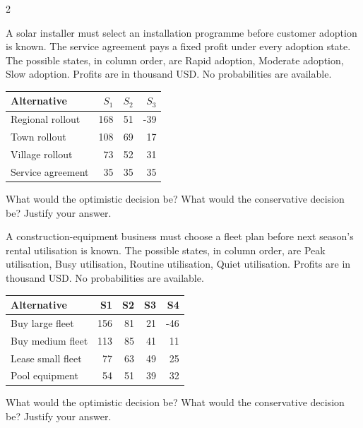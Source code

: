 \begin{multicols}{2}
\begin{minipage}{\linewidth}
A solar installer must select an installation programme before customer adoption is known. The service agreement pays a fixed profit under every adoption state. The possible states, in column order, are Rapid adoption, Moderate adoption, Slow adoption. Profits are in thousand USD. No probabilities are available.
\begin{center}\small\setlength{\tabcolsep}{4pt}
\begin{tabular}{@{}lrrr@{}}\toprule
Alternative&$S_1$&$S_2$&$S_3$\\\midrule
Regional rollout&168&51&-39\\
Town rollout&108&69&17\\
Village rollout&73&52&31\\
Service agreement&35&35&35\\\bottomrule
\end{tabular}\end{center}

What would the optimistic decision be? What would the conservative decision be? Justify your answer. 
\end{minipage}\par

\begin{minipage}{\linewidth}
A construction-equipment business must choose a fleet plan before next season's rental utilisation is known. The possible states, in column order, are Peak utilisation, Busy utilisation, Routine utilisation, Quiet utilisation. Profits are in thousand USD. No probabilities are available.
\begin{center}\small\setlength{\tabcolsep}{4pt}
\begin{tabular}{@{}lrrrr@{}}\toprule
Alternative&S1&S2&S3&S4\\\midrule
Buy large fleet&156&81&21&-46\\
Buy medium fleet&113&85&41&11\\
Lease small fleet&77&63&49&25\\
Pool equipment&54&51&39&32\\\bottomrule
\end{tabular}\end{center}

What would the optimistic decision be? What would the conservative decision be? Justify your answer. 
\end{minipage}\par


\end{multicols}
